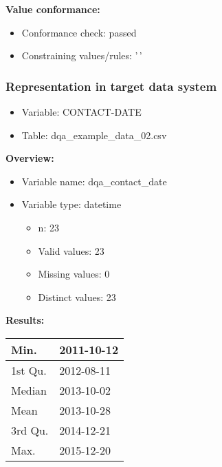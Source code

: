 \documentclass[
]{article}
\providecommand{\tightlist}{%
  \setlength{\itemsep}{0pt}\setlength{\parskip}{0pt}}
\begin{document}
\textbf{Value conformance:}

\begin{itemize}
\tightlist
\item
  Conformance check: passed
\item
  Constraining values/rules: '\,'
\end{itemize}

\newpage

\hypertarget{representation-in-target-data-system-5}{%
\subsubsection{\texorpdfstring{Representation in \textbf{target} data
system}{Representation in target data system}}\label{representation-in-target-data-system-5}}

\begin{itemize}
\tightlist
\item
  Variable: CONTACT-DATE
\item
  Table: dqa\_example\_data\_02.csv
\end{itemize}

\textbf{Overview:}

\begin{itemize}
\tightlist
\item
  Variable name: dqa\_contact\_date
\item
  Variable type: datetime

  \begin{itemize}
  \tightlist
  \item
    n: 23
  \item
    Valid values: 23
  \item
    Missing values: 0
  \item
    Distinct values: 23
  \end{itemize}
\end{itemize}

\textbf{Results:}\\

\begin{table}[H]
\centering
\begin{tabular}{l|l}
\hline
Min. & 2011-10-12\\
\hline
1st Qu. & 2012-08-11\\
\hline
Median & 2013-10-02\\
\hline
Mean & 2013-10-28\\
\hline
3rd Qu. & 2014-12-21\\
\hline
Max. & 2015-12-20\\
\hline
\end{tabular}
\end{table}
\end{document}
